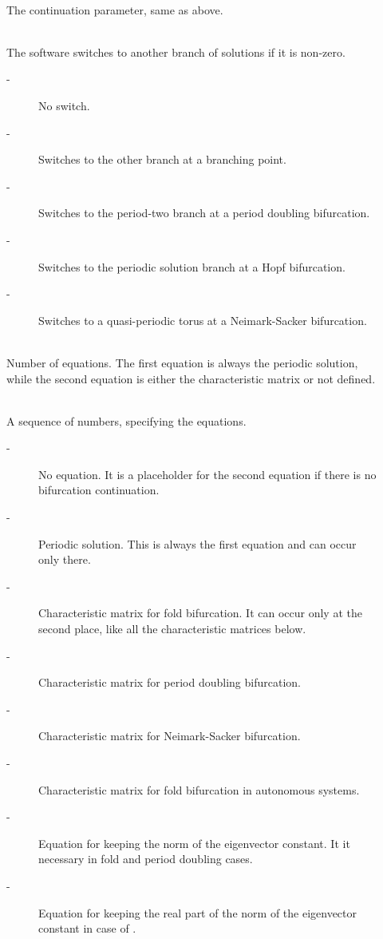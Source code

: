 \documentclass[10pt,a4paper]{ddedoc}
\begin{document}
\begin{description}
\item[] ~\\
	The continuation parameter, same as above.
%
\item[] ~\\
	The software switches to another branch of solutions if it is non-zero.
\begin{description}
\item[ -] No switch.
\item[ -] Switches to the other branch at a branching point. %
\item[ -] Switches to the period-two branch at a period doubling bifurcation.
\item[ -] Switches to the periodic solution branch at a Hopf bifurcation.
\item[ -] Switches to a quasi-periodic torus at a Neimark-Sacker bifurcation.
\end{description}
\item[] ~\\
	Number of equations. The first equation is always the periodic solution, 
	while the second equation is either the characteristic matrix or not defined.
\item[] ~\\
	A sequence of numbers, specifying the equations.
\begin{description}
\item[ -] No equation. It is a placeholder for the second equation if there is no bifurcation continuation.
\item[ -] Periodic solution. This is always the first equation and can occur only there.
\item[ -] Characteristic matrix for fold bifurcation. It can occur only at the second place, like all the characteristic matrices below.
\item[ -] Characteristic matrix for period doubling bifurcation.
\item[ -] Characteristic matrix for Neimark-Sacker bifurcation.
\item[ -] Characteristic matrix for fold bifurcation in autonomous systems.
\item[ -] Equation for keeping the norm of the eigenvector constant. It it necessary in fold and period doubling cases.
\item[ -] Equation for keeping the real part of the norm of the eigenvector constant in case of .

\end{description}
\end{description}
\end{document}

